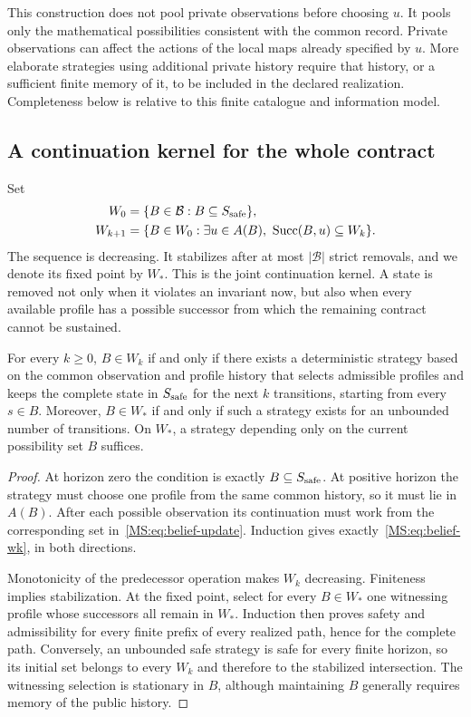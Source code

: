 This construction does not pool private observations before choosing $u$. It pools only the mathematical possibilities consistent with the common record. Private observations can affect the actions of the local maps already specified by $u$. More elaborate strategies using additional private history require that history, or a sufficient finite memory of it, to be included in the declared realization. Completeness below is relative to this finite catalogue and information model.

\subsection{A continuation kernel for the whole contract}
Set
\begin{align}
W_0&=\{B\in\mathcal B:B\subseteq S_{\rm safe}\},\label{MS:eq:belief-w0}\\
W_{k+1}&=\{B\in W_0:\exists u\in A(B),\
\operatorname{Succ}(B,u)\subseteq W_k\}.\label{MS:eq:belief-wk}
\end{align}
The sequence is decreasing. It stabilizes after at most $|\mathcal B|$ strict removals, and we denote its fixed point by $W_*$. This is the joint continuation kernel. A state is removed not only when it violates an invariant now, but also when every available profile has a possible successor from which the remaining contract cannot be sustained.

\begin{MStheorem}\label{MS:thm:joint-viability}
For every $k\geq0$, $B\in W_k$ if and only if there exists a deterministic strategy based on the common observation and profile history that selects admissible profiles and keeps the complete state in $S_{\rm safe}$ for the next $k$ transitions, starting from every $s\in B$. Moreover, $B\in W_*$ if and only if such a strategy exists for an unbounded number of transitions. On $W_*$, a strategy depending only on the current possibility set $B$ suffices.
\end{MStheorem}
\begin{proof}
At horizon zero the condition is exactly $B\subseteq S_{\rm safe}$. At positive horizon the strategy must choose one profile from the same common history, so it must lie in $A(B)$. After each possible observation its continuation must work from the corresponding set in~\eqref{MS:eq:belief-update}. Induction gives exactly~\eqref{MS:eq:belief-wk}, in both directions.

Monotonicity of the predecessor operation makes $W_k$ decreasing. Finiteness implies stabilization. At the fixed point, select for every $B\in W_*$ one witnessing profile whose successors all remain in $W_*$. Induction then proves safety and admissibility for every finite prefix of every realized path, hence for the complete path. Conversely, an unbounded safe strategy is safe for every finite horizon, so its initial set belongs to every $W_k$ and therefore to the stabilized intersection. The witnessing selection is stationary in $B$, although maintaining $B$ generally requires memory of the public history.
\end{proof}

